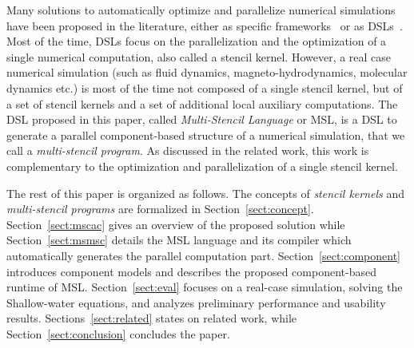 Many solutions to automatically optimize and parallelize numerical simulations have been proposed in the literature, either as specific frameworks~\cite{CPE:CPE3494,Trilinos-Overview,petsc-efficient} or as DSLs~\cite{spaaTangCKLL11,citeulike12258902,Giles2011,DeVito2011LDS}. Most of the time, DSLs focus on the parallelization and the optimization of a single numerical computation, also called a stencil kernel.
However, a real case numerical simulation (such as fluid dynamics, magneto-hydrodynamics, molecular dynamics etc.) is most of the time not composed of a single stencil kernel, but of a set of stencil kernels and a set of additional local auxiliary computations. The DSL proposed in this paper, called \emph{Multi-Stencil Language} or MSL, is a DSL to generate a parallel component-based structure of a numerical simulation, that we call a \emph{multi-stencil program}. As discussed in the related work, this work is complementary to the optimization and parallelization of a single stencil kernel.

The rest of this paper is organized as follows. The concepts of \emph{stencil kernels} and \emph{multi-stencil programs} are formalized in Section~\ref{sect:concept}. Section~\ref{sect:mscac} gives an overview of the proposed solution while Section~\ref{sect:msmsc} details the MSL language and its compiler which automatically generates the parallel computation part. Section~\ref{sect:component} introduces component models and describes the proposed component-based runtime of MSL.
Section~\ref{sect:eval} focuses on a real-case simulation, solving the Shallow-water equations, and analyzes preliminary performance and usability results. Sections~\ref{sect:related} states on related work, while Section~\ref{sect:conclusion} concludes the paper.
